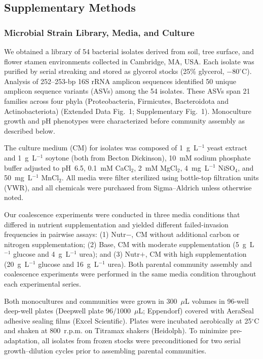 \subsection*{Supplementary Methods}
\label{sec:suppl:methods}

\subsubsection*{Microbial Strain Library, Media, and Culture}
\label{sec:suppl:strains}

We obtained a library of 54 bacterial isolates derived from soil, tree surface, and flower stamen environments collected in Cambridge, MA, USA. Each isolate was purified by serial streaking and stored as glycerol stocks (25\% glycerol, $-80^\circ$C). Analysis of 252--253-bp 16S rRNA amplicon sequences identified 50 unique amplicon sequence variants (ASVs) among the 54 isolates. These ASVs span 21 families across four phyla (Proteobacteria, Firmicutes, Bacteroidota and Actinobacteriota) (Extended Data Fig.~1; Supplementary Fig.~1). Monoculture growth and pH phenotypes were characterized before community assembly as described below.

The culture medium (CM) for isolates was composed of 1~g~L$^{-1}$ yeast extract and 1~g~L$^{-1}$ soytone (both from Becton Dickinson), 10~mM sodium phosphate buffer adjusted to pH~6.5, 0.1~mM CaCl$_2$, 2~mM MgCl$_2$, 4~mg~L$^{-1}$ NiSO$_4$, and 50~mg~L$^{-1}$ MnCl$_2$. All media were filter sterilized using bottle-top filtration units (VWR), and all chemicals were purchased from Sigma--Aldrich unless otherwise noted.

Our coalescence experiments were conducted in three media conditions that differed in nutrient supplementation and yielded different failed-invasion frequencies in pairwise assays: (1) Nutr$-$, CM without additional carbon or nitrogen supplementation; (2) Base, CM with moderate supplementation (5~g~L$^{-1}$ glucose and 4~g~L$^{-1}$ urea); and (3) Nutr$+$, CM with high supplementation (20~g~L$^{-1}$ glucose and 16~g~L$^{-1}$ urea). Both parental community assembly and coalescence experiments were performed in the same media condition throughout each experimental series.

Both monocultures and communities were grown in 300~$\mu$L volumes in 96-well deep-well plates (Deepwell plate 96/1000~$\mu$L; Eppendorf) covered with AeraSeal adhesive sealing films (Excel Scientific). Plates were incubated aerobically at 25$^\circ$C and shaken at 800~r.p.m. on Titramax shakers (Heidolph). To minimize pre-adaptation, all isolates from frozen stocks were preconditioned for two serial growth--dilution cycles prior to assembling parental communities.



